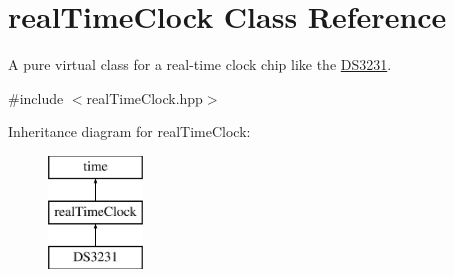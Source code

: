 \hypertarget{classreal_time_clock}{}\section{real\+Time\+Clock Class Reference}
\label{classreal_time_clock}


A pure virtual class for a real-\/time clock chip like the \mbox{\hyperlink{class_d_s3231}{D\+S3231}}.  




{\ttfamily \#include $<$real\+Time\+Clock.\+hpp$>$}

Inheritance diagram for real\+Time\+Clock\+:\begin{figure}[H]
\begin{center}
\leavevmode
\includegraphics[height=3.000000cm]{classreal_time_clock}
\end{center}
\end{figure}
